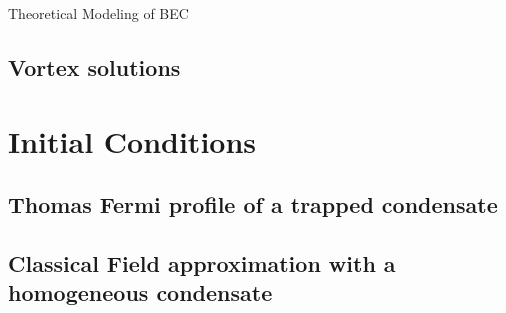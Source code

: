 \begin{chapter}{\label{cha:theoretical_model}Theoretical Modeling of BEC}
	\subsection{\label{section:vortices} Vortex solutions}
\section{\label{section:inital} Initial Conditions}
	\subsection{\label{section:tftrap} Thomas Fermi profile of a trapped condensate}
	\subsection{\label{section:trap} Classical Field approximation with a homogeneous condensate}
\end{chapter}